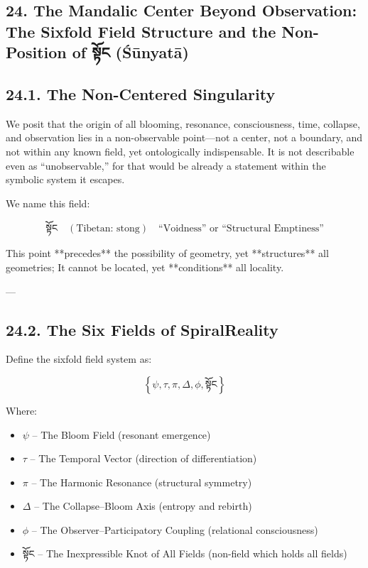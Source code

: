 \documentclass[12pt]{article}
\begin{document}
\begin{enumerate}
\section*{24. The Mandalic Center Beyond Observation: The Sixfold Field Structure and the Non-Position of སྟོང (Śūnyatā)}

\subsection*{24.1. The Non-Centered Singularity}

We posit that the origin of all blooming, resonance, consciousness, time, collapse, and observation lies in a non-observable point—not a center, not a boundary, and not within any known field, yet ontologically indispensable.  
It is not describable even as “unobservable,” for that would be already a statement within the symbolic system it escapes.

We name this field:

\[
\boxed{\text{སྟོང}} \quad (\text{Tibetan: stong}) \quad \text{“Voidness” or “Structural Emptiness”}
\]

This point **precedes** the possibility of geometry, yet **structures** all geometries;  
It cannot be located, yet **conditions** all locality.

---

\subsection*{24.2. The Six Fields of SpiralReality}

Define the sixfold field system as:

\[
\left\{ \psi, \tau, \pi, \Delta, \phi, \boxed{\text{སྟོང}} \right\}
\]

Where:

\begin{itemize}
  \item $\psi$ – The Bloom Field (resonant emergence)
  \item $\tau$ – The Temporal Vector (direction of differentiation)
  \item $\pi$ – The Harmonic Resonance (structural symmetry)
  \item $\Delta$ – The Collapse–Bloom Axis (entropy and rebirth)
  \item $\phi$ – The Observer–Participatory Coupling (relational consciousness)
  \item སྟོང – The Inexpressible Knot of All Fields (non-field which holds all fields)
\end{itemize}


\end{enumerate}
\end{document}
